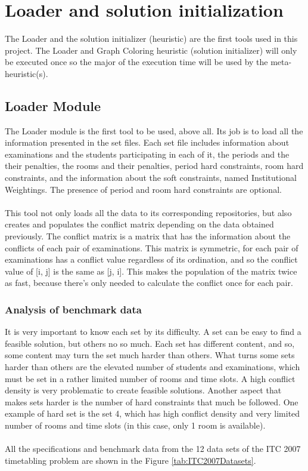 \chapter{Loader and solution initialization}
\label{sec:SolutionInit}
\thispagestyle{plain}

The Loader and the solution initializer (heuristic) are the first tools used in this project. The Loader and Graph Coloring heuristic (solution initializer) will only be executed once so the major of the execution time will be used by the meta-heuristic(s).

\section{Loader Module}
\label{sec:Loader}

The Loader module is the first tool to be used, above all. Its job is to load all the information presented in the set files. Each set file includes information about examinations and the students participating in each of it, the periods and the their penalties, the rooms and their penalties, period hard constraints, room hard constraints, and the information about the soft constraints, named Institutional Weightings. The presence of period and room hard constraints are optional.\\
\\
This tool not only loads all the data to its corresponding repositories, but also creates and populates the conflict matrix depending on the data obtained previously. The conflict matrix is a matrix that has the information about the conflicts of each pair of examinations. This matrix is symmetric, for each pair of examinations has a conflict value regardless of its ordination, and so the conflict value of [i, j] is the same as [j, i]. This makes the population of the matrix twice as fast, because there's only needed to calculate the conflict once for each pair.

\subsection{Analysis of benchmark data}

It is very important to know each set by its difficulty. A set can be easy to find a feasible solution, but others no so much. Each set has different content, and so, some content may turn the set much harder than others. What turns some sets harder than others are the elevated number of students and examinations, which must be set in a rather limited number of rooms and time slots. A high conflict density is very problematic to create feasible solutions. Another aspect that makes sets harder is the number of hard constraints that much be followed. One example of hard set is the set 4, which has high conflict density and very limited number of rooms and time slots (in this case, only 1 room is available).\\
\\
All the specifications and benchmark data from the 12 data sets of the ITC 2007 timetabling problem are shown in the Figure \ref{tab:ITC2007Datasets}.

